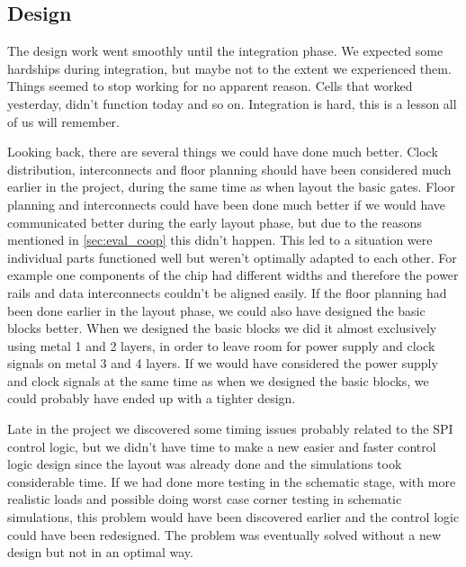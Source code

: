 \subsection{Design}
The design work went smoothly until the integration phase. We expected some hardships during integration, but maybe not to the extent we experienced them. Things seemed to stop working for no apparent reason. Cells that worked yesterday, didn't function today and so on. Integration is hard, this is a lesson all of us will remember. 

Looking back, there are several things we could have done much better. Clock distribution, interconnects and floor planning should have been considered much earlier in the project, during the same time as when layout the basic gates. Floor planning and interconnects could have been done much better if we would have communicated better during the early layout phase, but due to the reasons mentioned in \ref{sec:eval_coop} this didn't happen. This led to a situation were individual parts functioned well but weren't optimally adapted to each other. For example one components of the chip had different widths and therefore the power rails and data interconnects couldn't be aligned easily. If the floor planning had been done earlier in the layout phase, we could also have designed the basic blocks better. When we designed the basic blocks we did it almost exclusively using metal 1 and 2 layers, in order to leave room for power supply and clock signals on metal 3 and 4 layers. If we would have considered the power supply and clock signals at the same time as when we designed the basic blocks, we could probably have ended up with a tighter design.

Late in the project we discovered some timing issues probably related to the SPI control logic, but we didn't have time to make a new easier and faster control logic design since the layout was already done and the simulations took considerable time. If we had done more testing in the schematic stage, with more realistic loads and possible doing worst case corner testing in schematic simulations, this problem would have been discovered earlier and the control logic could have been redesigned. The problem was eventually solved without a new design but not in an optimal way.

